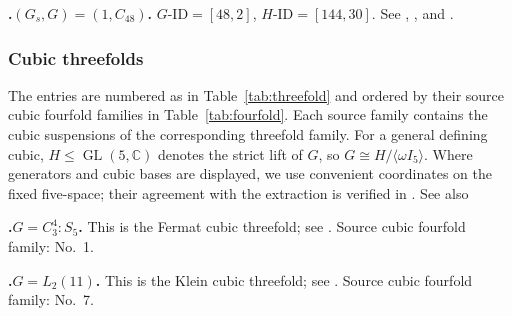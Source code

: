 \documentclass[12pt]{amsart}
\numberwithin{equation}{section}
\theoremstyle{plain}
\theoremstyle{definition}
\theoremstyle{remark}
\newcommand{\CC}{\mathbb C}
\DeclareMathOperator{\GL}{GL}
\begin{document}
\par{}\medskip\noindent\textbf{.\enspace $(G_s,G)=(1,C_{48})$.}\label{fam:fourfold-no-156}
$G\text{-ID}=[48,2]$, $H\text{-ID}=[144,30]$.
See
\cite[\S2.2 and Theorem~4.2]{zheng2021liftableabelian},
\cite[\S6.1, (5)]{yang2024automorphism}, and
\cite[Proposition~7.1]{FWZ26}.

\subsubsection{Cubic threefolds}
\label{subsubsection: description of threefolds}

The entries are numbered as in Table~\ref{tab:threefold} and ordered by
their source cubic fourfold families in Table~\ref{tab:fourfold}.  Each
source family contains the cubic suspensions of the corresponding threefold
family.  For a general defining cubic, $H\leq\GL(5,\CC)$ denotes the
strict lift of $G$, so $G\cong H/\langle\omega I_5\rangle$.  Where
generators and cubic bases are displayed, we use convenient coordinates
on the fixed five-space; their agreement with the extraction is verified
in . See also 

\par{}\medskip\noindent\textbf{.\enspace $G=C_3^4:S_5$.}\label{fam:threefold-no-1}
This is the Fermat cubic threefold; see \cite[Example~3.1(1)]{LiYuThreefold}.
Source cubic fourfold family: No.~1.

\par{}\medskip\noindent\textbf{.\enspace $G=L_2(11)$.}\label{fam:threefold-no-2}
This is the Klein cubic threefold; see \cite[Example~3.1(5)]{LiYuThreefold}.
Source cubic fourfold family: No.~7.
\end{document}
